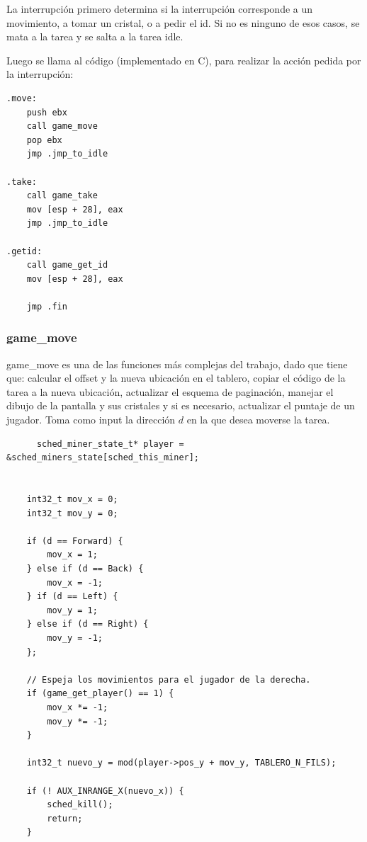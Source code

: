 \documentclass[a4paper]{article}
\newenvironment{codesnippet}{%
	\begin{Sbox}\begin{minipage}{\textwidth}\sffamily\small}%
	{\end{minipage}\end{Sbox}%
		\begin{center}%
		\vspace{-0.4cm}\colorbox{litegrey}{\TheSbox}\end{center}\vspace{0.3cm}}
\begin{document}
La interrupción primero determina si la interrupción corresponde a un movimiento, a tomar un cristal, o a pedir el id.
Si no es ninguno de esos casos, se mata a la tarea y se salta a la tarea idle.

Luego se llama al código (implementado en C), para realizar la acción pedida por la interrupción:

\begin{codesnippet}
  \begin{verbatim}
.move:
    push ebx
    call game_move
    pop ebx
    jmp .jmp_to_idle

.take:
    call game_take
    mov [esp + 28], eax
    jmp .jmp_to_idle

.getid:
    call game_get_id
    mov [esp + 28], eax

    jmp .fin
     \end{verbatim}
\end{codesnippet} 

\subsubsection{game_move}

game_move es una de las funciones más complejas del trabajo, dado que tiene que: calcular el offset y la nueva ubicación
en el tablero, copiar el código de la tarea a la nueva ubicación, actualizar el esquema de paginación, manejar el dibujo
de la pantalla y sus cristales y si es necesario, actualizar el puntaje de un jugador. Toma como input la dirección $d$
en la que desea moverse la tarea.

\begin{codesnippet}
  \begin{verbatim}
      sched_miner_state_t* player = &sched_miners_state[sched_this_miner];


    int32_t mov_x = 0;
    int32_t mov_y = 0;

    if (d == Forward) {
        mov_x = 1;
    } else if (d == Back) {
        mov_x = -1;
    } if (d == Left) {
        mov_y = 1;
    } else if (d == Right) {
        mov_y = -1;
    };

    // Espeja los movimientos para el jugador de la derecha.
    if (game_get_player() == 1) {
        mov_x *= -1;
        mov_y *= -1;
    }

    int32_t nuevo_y = mod(player->pos_y + mov_y, TABLERO_N_FILS);

    if (! AUX_INRANGE_X(nuevo_x)) {
        sched_kill();
        return;
    }
     \end{verbatim}
\end{codesnippet} 
\end{document}
